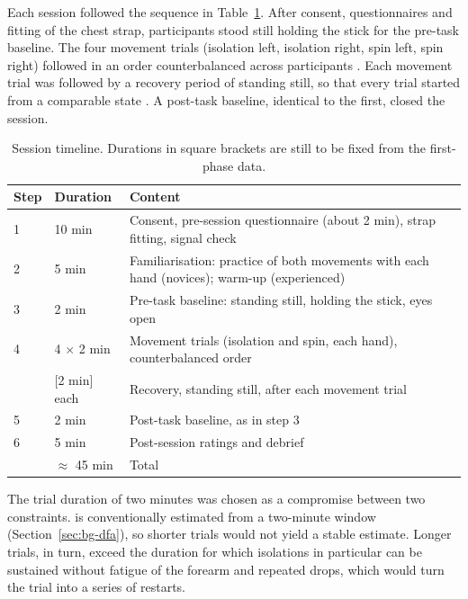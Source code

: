 Each session followed the sequence in Table~\ref{tab:session}. After consent, questionnaires and fitting of the chest strap, participants stood still holding the stick for the pre-task baseline. The four movement trials (isolation left, isolation right, spin left, spin right) followed in an order counterbalanced across participants . Each movement trial was followed by a recovery period of standing still, so that every trial started from a comparable state . A post-task baseline, identical to the first, closed the session.

\begin{table}[ht]
\centering
\caption{Session timeline. Durations in square brackets are still to be fixed from the first-phase data.}
\label{tab:session}
\small
\begin{tabularx}{\textwidth}{l l X}
\toprule
Step & Duration & Content \\
\midrule
1 & 10 min & Consent, pre-session questionnaire (about 2 min), strap fitting, signal check \\
2 & 5 min & Familiarisation: practice of both movements with each hand (novices); warm-up (experienced) \\
3 & 2 min & Pre-task baseline: standing still, holding the stick, eyes open \\
4 & 4 $\times$ 2 min & Movement trials (isolation and spin, each hand), counterbalanced order \\
  & [2 min] each & Recovery, standing still, after each movement trial \\
5 & 2 min & Post-task baseline, as in step 3 \\
6 & 5 min & Post-session ratings and debrief \\
\midrule
 & $\approx$ 45 min & Total \\
\bottomrule
\end{tabularx}
\end{table}

The trial duration of two minutes was chosen as a compromise between two constraints. \al{} is conventionally estimated from a two-minute window (Section~\ref{sec:bg-dfa}), so shorter trials would not yield a stable estimate. Longer trials, in turn, exceed the duration for which isolations in particular can be sustained without fatigue of the forearm and repeated drops, which would turn the trial into a series of restarts. 

